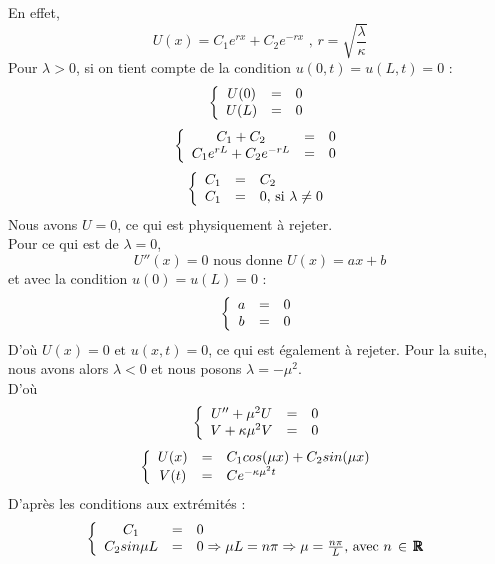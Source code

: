 \documentclass[a4paper,12pt]{report}
\begin{document}
En effet, \[U(x) = C_{1}e^{rx} + C_{2}e^{-rx}\text{ , } r=\sqrt{\frac{\lambda}{\kappa}}\]
Pour $\lambda > 0$, si on tient compte de la condition $u(0,t)=u(L,t)=0$ :
\[
\left\{
  \begin{array}{c c l}
  U(0)&=&0\\
  U(L)&=&0\\
  \end{array}
\right.\]
\[
\left\{
  \begin{array}{c c l}
  C_{1} + C_{2} &=& 0\\
  C_{1}e^{rL} + C_{2}e^{-rL} &=& 0\\
  \end{array}
\right.\]
\[
\left\{
  \begin{array}{c c l}
  C_{1} &=& C_{2}\\
  C_{1} &=& 0 \text{, si }\lambda \ne 0\\
  \end{array}
\right.\]
Nous avons $U = 0$, ce qui est physiquement \`a rejeter.\\
Pour ce qui est de $\lambda = 0$,
\[U''(x)=0 \text{ nous donne } U(x)=ax+b\]
et avec la condition $u(0) = u(L) = 0$ :
\[ 
\left\{
  \begin{array}{c c l}
  a&=&0\\
  b&=&0\\
  \end{array}
\right.\]\newpage
D'o\`u $U(x)=0 \text{ et } u(x,t)=0$, ce qui est \'egalement \`a rejeter.
Pour la suite, nous avons alors $\lambda < 0$ et nous posons $\lambda = -\mu^{2}$.\\
D'o\`u
\[ 
\left\{
  \begin{array}{c c l}
  U'' + \mu^{2}U &=& 0\\
  V + \kappa \mu^{2}V &=& 0\\
  \end{array}
\right.\]
\[ 
\left\{
  \begin{array}{c c l}
  U(x) &=& C_{1}cos(\mu x) + C_{2}sin(\mu x)\\
  V(t) &=& Ce^{-\kappa \mu^{2}t}\\
  \end{array}
\right.\]
D'apr\`es les conditions aux extr\'emit\'es :
\[ 
\left\{
  \begin{array}{c c l}
  C_{1} &=& 0\\
  C_{2}sin\mu L &=& 0 \Rightarrow \mu L = n\pi \Rightarrow \mu = \frac{n\pi}{L}\text{, avec }n\,\in\,\pmb{\mathbb{R}}\\
  \end{array}
\right.\]
\end{document}
